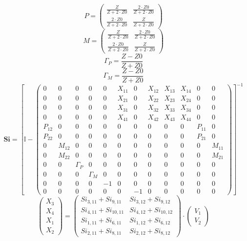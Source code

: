 \[ P=\left(\begin{smallmatrix} \frac{Z}{Z+2\cdot Z0} & \frac{2\cdot
Z0}{Z+2\cdot Z0} \\ \frac{2\cdot Z0}{Z+2\cdot Z0} & \frac{Z}{Z+2\cdot
Z0} \end{smallmatrix}\right) \]
\[ M=\left(\begin{smallmatrix} \frac{Z}{Z+2\cdot Z0} & \frac{2\cdot
Z0}{Z+2\cdot Z0} \\ \frac{2\cdot Z0}{Z+2\cdot Z0} & \frac{Z}{Z+2\cdot
Z0} \end{smallmatrix}\right) \]
\[ \Gamma_P=\frac{ Z -Z0}{ Z +Z0} \]
\[ \Gamma_M=\frac{ Z -Z0}{ Z +Z0} \]
\[ \mathbf{Si} = \left[ \mathbb{I}  - \left(\begin{smallmatrix} 0 & 0
& 0 & 0 & 0 & X_{11} & 0 & X_{12} & X_{13} & X_{14} & 0 & 0 \\ 0 & 0 &
0 & 0 & 0 & X_{21} & 0 & X_{22} & X_{23} & X_{24} & 0 & 0 \\ 0 & 0 & 0
& 0 & 0 & X_{31} & 0 & X_{32} & X_{33} & X_{34} & 0 & 0 \\ 0 & 0 & 0 &
0 & 0 & X_{41} & 0 & X_{42} & X_{43} & X_{44} & 0 & 0 \\ P_{12} & 0 &
0 & 0 & 0 & 0 & 0 & 0 & 0 & 0 & P_{11} & 0 \\ P_{22} & 0 & 0 & 0 & 0 &
0 & 0 & 0 & 0 & 0 & P_{21} & 0 \\ 0 & M_{12} & 0 & 0 & 0 & 0 & 0 & 0 &
0 & 0 & 0 & M_{11} \\ 0 & M_{22} & 0 & 0 & 0 & 0 & 0 & 0 & 0 & 0 & 0 &
M_{21} \\ 0 & 0 & \Gamma_{P} & 0 & 0 & 0 & 0 & 0 & 0 & 0 & 0 & 0 \\ 0
& 0 & 0 & \Gamma_{M} & 0 & 0 & 0 & 0 & 0 & 0 & 0 & 0 \\ 0 & 0 & 0 & 0
& -1 & 0 & 0 & 0 & 0 & 0 & 0 & 0 \\ 0 & 0 & 0 & 0 & 0 & 0 & -1 & 0 & 0
& 0 & 0 & 0 \end{smallmatrix}\right) \right]^{-1} \]
\[ \left(\begin{array}{c} X_{3} \\ X_{4} \\ X_{1} \\ X_{2}
\end{array}\right)=\left(\begin{smallmatrix} Si_{3,11} + Si_{9,11} &
Si_{3,12} + Si_{9,12} \\ Si_{4,11} + Si_{10,11} & Si_{4,12} +
Si_{10,12} \\ Si_{1,11} + Si_{6,11} & Si_{1,12} + Si_{6,12} \\
Si_{2,11} + Si_{8,11} & Si_{2,12} + Si_{8,12}
\end{smallmatrix}\right)\cdot \left(\begin{array}{c} V_{1} \\ V_{2}
\end{array}\right) \]
